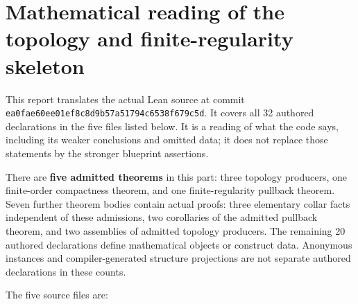 \documentclass[
  letterpaper,
  11pt]{article}
\begin{document}
\section{Mathematical reading of the topology and finite-regularity
skeleton}\label{topology-finite-regularity}

This report translates the actual Lean source at commit
{\small\texttt{ea0fae6\allowbreak{}0ee01ef8\allowbreak{}c8d9b57a\allowbreak{}51794c65\allowbreak{}38f679c5\allowbreak{}d}}.
It covers all 32 authored declarations in the five files listed below.
It is a reading of what the code says, including its weaker conclusions
and omitted data; it does not replace those statements by the stronger
blueprint assertions.

There are \textbf{five admitted theorems} in this part: three topology
producers, one finite-order compactness theorem, and one
finite-regularity pullback theorem. Seven further theorem bodies contain
actual proofs: three elementary collar facts independent of these
admissions, two corollaries of the admitted pullback theorem, and two
assemblies of admitted topology producers. The remaining 20 authored
declarations define mathematical objects or construct data. Anonymous
instances and compiler-generated structure projections are not separate
authored declarations in these counts.

The five source files are:
\end{document}
